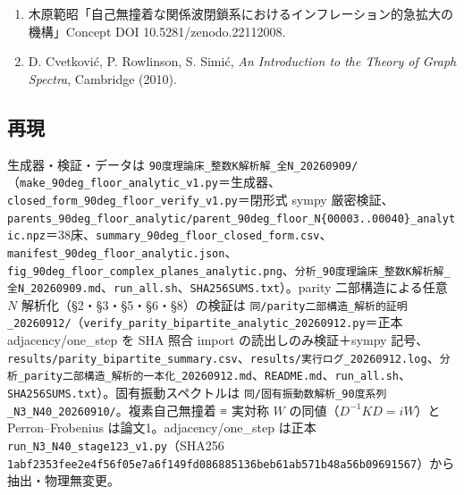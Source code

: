 \documentclass[
  a4paper,
]{ltjsarticle}
\providecommand{\tightlist}{%
  \setlength{\itemsep}{0pt}\setlength{\parskip}{0pt}}
\begin{document}
\begin{enumerate}
\def\labelenumi{\arabic{enumi}.}
\tightlist
\item
  木原範昭「自己無撞着な関係波閉鎖系におけるインフレーション的急拡大の機構」Concept
  DOI 10.5281/zenodo.22112008.
\item
  D. Cvetković, P. Rowlinson, S. Simić, \emph{An Introduction to the
  Theory of Graph Spectra}, Cambridge (2010).
\end{enumerate}

\subsection{再現}\label{ux518dux73fe}

生成器・検証・データは
\texttt{90度理論床\_整数K解析解\_全N\_20260909/}（\texttt{make\_90deg\_floor\_analytic\_v1.py}＝生成器、\texttt{closed\_form\_90deg\_floor\_verify\_v1.py}＝閉形式
sympy
厳密検証、\texttt{parents\_90deg\_floor\_analytic/parent\_90deg\_floor\_N\{00003..00040\}\_analytic.npz}＝38床、\texttt{summary\_90deg\_floor\_closed\_form.csv}、\texttt{manifest\_90deg\_floor\_analytic.json}、\texttt{fig\_90deg\_floor\_complex\_planes\_analytic.png}、\texttt{分析\_90度理論床\_整数K解析解\_全N\_20260909.md}、\texttt{run\_all.sh}、\texttt{SHA256SUMS.txt}）。parity
二部構造による任意 \(N\) 解析化（§2・§3・§5・§6・§8）の検証は
\texttt{同/parity二部構造\_解析的証明\_20260912/}（\texttt{verify\_parity\_bipartite\_analytic\_20260912.py}＝正本
adjacency/one\_step を SHA 照合 import の読出しのみ検証＋sympy
記号、\texttt{results/parity\_bipartite\_summary.csv}、\texttt{results/実行ログ\_20260912.log}、\texttt{分析\_parity二部構造\_解析的一本化\_20260912.md}、\texttt{README.md}、\texttt{run\_all.sh}、\texttt{SHA256SUMS.txt}）。固有振動スペクトルは
\texttt{同/固有振動数解析\_90度系列\_N3\_N40\_20260910/}。複素自己無撞着
≡ 実対称 \(W\) の同値（\(D^{-1}KD=iW\)）と Perron--Frobenius
は論文1。adjacency/one\_step は正本
\texttt{run\_N3\_N40\_stage123\_v1.py}（SHA256
\texttt{1abf2353fee2e4f56f05e7a6f149fd086885136beb61ab571b48a56b09691567}）から抽出・物理無変更。
\end{document}
